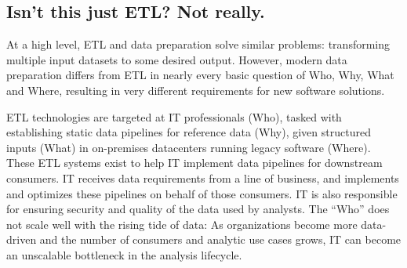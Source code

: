 \documentclass[11pt]{article}
\begin{document}

\subsection{Isn't this just ETL? Not really.}
At a high level, ETL and data preparation solve similar problems: transforming multiple input datasets to some desired output.  However, modern data preparation differs from ETL in nearly every basic question of Who, Why, What and Where, resulting in very different requirements for new software solutions.

ETL technologies are targeted at IT professionals (Who), tasked with establishing static data pipelines for reference data (Why), given structured inputs (What) in on-premises datacenters running legacy software (Where). These ETL systems
exist to help IT implement data pipelines for downstream consumers.  IT receives data requirements from a line of business, and implements and optimizes these pipelines on behalf of those consumers. IT is also responsible for ensuring security and quality of the data used by analysts.  The ``Who'' does not scale well with the rising tide of data: As organizations become more data-driven and the number of consumers and analytic use cases grows,  IT can become an unscalable bottleneck in the analysis lifecycle.
\end{document}

